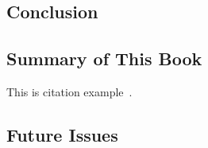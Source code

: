 \begin{bibunit}
\setcounter{chapter}{2}
\chapter{Conclusion}\label{chap:3}
\acresetall

\section{Summary of This Book}

This is citation example~\cite{Einstein1905SR}.
\lipsum[60]


\section{Future Issues}

\lipsum[60]


\putbib
\end{bibunit}